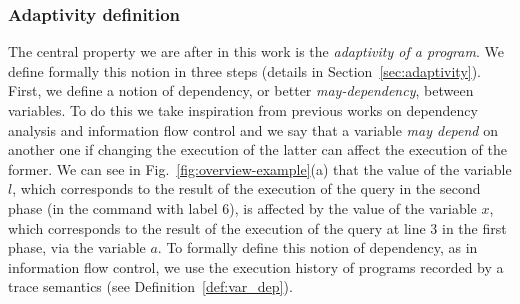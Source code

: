 \subsubsection{Adaptivity definition}
\label{sec:adaptivity-informal}

The central property we are after in this work is the \emph{adaptivity of a program}. We define formally this notion in three steps (details in Section~\ref{sec:adaptivity}). First, we define a notion of dependency, or better \emph{may-dependency}, between variables. To do this we take inspiration from previous works on dependency analysis and information flow control and we say that a variable \emph{may depend} on another one if changing the execution of the latter can affect the execution of the former. 
We can see in Fig.~\ref{fig:overview-example}(a) that the value of the variable $l$, which corresponds to the result of the execution of the query in the second phase (in the command with label 6), is affected by the value of the variable $x$, which corresponds to the result of the execution of the query at line 3 in the first phase, via the variable $a$.
To formally define this notion of dependency, as in information flow control, we use the execution history of programs recorded by a trace semantics (see Definition~\ref{def:var_dep}).

